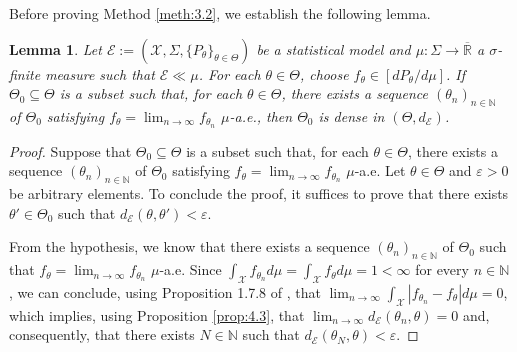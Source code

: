 \documentclass[12pt]{article}
\newtheorem{lemma}{Lemma}[section]
\begin{document}
Before proving Method \ref{meth:3.2}, we establish the following lemma.

\begin{lemma}
\label{lemma:4.2}
Let $\mathcal{E}:=(\mathcal{X},\Sigma,\{P_\theta\}_{\theta\in\Theta})$ be a statistical model and $\mu :\Sigma\to\overline{\mathbb{R}}$ a $\sigma$-finite measure such that $\mathcal{E}\ll \mu$. For each $\theta\in\Theta$, choose $f_\theta \in [dP_\theta /d\mu ]$. If $\Theta _0\subseteq \Theta$ is a subset such that, for each $\theta\in\Theta$, there exists a sequence $(\theta _n)_{n\in\mathbb{N}}$ of $\Theta _0$ satisfying $f_\theta =\lim_{n\to\infty}f_{\theta _n}$ $\mu$-a.e., then $\Theta _0$ is dense in $(\Theta,d_\mathcal{E})$.
\end{lemma}

\begin{proof}
Suppose that $\Theta _0\subseteq \Theta$ is a subset such that, for each $\theta\in\Theta$, there exists a sequence $(\theta _n)_{n\in\mathbb{N}}$ of $\Theta _0$ satisfying $f_\theta =\lim_{n\to\infty}f_{\theta _n}$ $\mu$-a.e. Let $\theta\in\Theta $ and $\varepsilon >0$ be arbitrary elements. To conclude the proof, it suffices to prove that there exists $\theta '\in\Theta _0$ such that $d_\mathcal{E}(\theta ,\theta ')<\varepsilon $.

From the hypothesis, we know that there exists a sequence $(\theta _n)_{n\in\mathbb{N}}$ of $\Theta _0$ such that $f_\theta =\lim_{n\to\infty}f_{\theta _n}$ $\mu$-a.e. Since $\int _\mathcal{X}f_{\theta _n}d\mu =\int _\mathcal{X}f_\theta d\mu =1<\infty $ for every $n\in\mathbb{N}$, we can conclude, using Proposition 1.7.8 of \cite{Lerner2014}, that $\lim_{n\to\infty}\int _\mathcal{X}|f_{\theta _n}-f_\theta |d\mu =0$, which implies, using Proposition \ref{prop:4.3}, that $\lim_{n\to\infty}d_\mathcal{E}(\theta _n,\theta )=0$ and, consequently, that there exists $N\in\mathbb{N}$ such that $d_\mathcal{E}(\theta _N,\theta )<\varepsilon $.
\end{proof}
\end{document}
